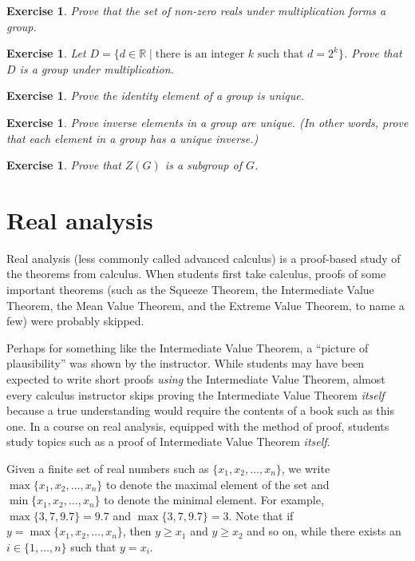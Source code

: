\documentclass{book}
\newcounter{ekcounter}%
\theoremstyle{ekimcustom}
\newtheorem{exercise}[ekcounter]{Exercise}
\begin{document}
\begin{exercise}
Prove that the set of non-zero reals under multiplication forms a group.
\end{exercise}

\begin{exercise}
Let $D=\{d \in \mathbb{R} \mid \text{there is an integer } k \text{ such that } d=2^k\}$. Prove that $D$ is a group under multiplication.
\end{exercise}

\begin{exercise}
Prove the identity element of a group is unique.
\end{exercise}

\begin{exercise}
Prove inverse elements in a group are unique. (In other words, prove that each element in a group has a unique inverse.)
\end{exercise}

\begin{exercise}
Prove that $Z(G)$ is a subgroup of $G$.
\end{exercise}

\section{Real analysis}

Real analysis (less commonly called advanced calculus) is a proof-based study of the theorems from calculus. When students first take calculus, proofs of some important theorems (such as the Squeeze Theorem, the Intermediate Value Theorem, the Mean Value Theorem, and the Extreme Value Theorem, to name a few) were probably skipped.

Perhaps for something like the Intermediate Value Theorem, a ``picture of plausibility'' was shown by the instructor. While students may have been expected to write short proofs \emph{using} the Intermediate Value Theorem, almost every calculus instructor skips proving the Intermediate Value Theorem \emph{itself} because a true understanding would require the contents of a book such as this one. In a course on real analysis, equipped with the method of proof, students study topics such as a proof of Intermediate Value Theorem \emph{itself}.

Given a finite set of real numbers such as $\{x_1,x_2,\dots, x_n\}$, 
we write $\max\{x_1,x_2,\dots, x_n\}$ to denote the maximal element of the set
and $\min\{x_1,x_2,\dots, x_n\}$ to denote the minimal element.
For example, $\max \{3,7,9.7\} = 9.7$ and $\max \{3,7,9.7\} = 3$.
Note that if $y = \max\{x_1,x_2,\dots, x_n\}$, then $y \geq x_1$ and $y \geq x_2$ and so on, while there exists an $i \in \{1,\dots,n\}$ such that $y = x_i$.
\end{document}
